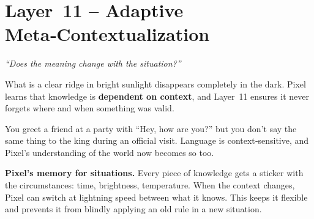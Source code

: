 \section{Layer~11 – Adaptive Meta‑Contextualization}
\label{sec:layer11}

\begin{tcolorbox}[colback=blue!5, colframe=blue!60, title=\textbf{Superpower: The Contextualiser}]
\begin{center}
\textit{“Does the meaning change with the situation?”}
\end{center}
\end{tcolorbox}

What is a clear ridge in bright sunlight disappears completely in the
dark.  Pixel learns that knowledge is \textbf{dependent on context},
and Layer~11 ensures it never forgets where and when something was
valid.

\begin{tcolorbox}[colback=yellow!5, colframe=yellow!80, title=Real‑life analogy]
You greet a friend at a party with “Hey, how are you?” but you don’t
say the same thing to the king during an official visit.  Language is
context‑sensitive, and Pixel’s understanding of the world now becomes
so too.
\end{tcolorbox}

\textbf{Pixel’s memory for situations.}
Every piece of knowledge gets a sticker with the circumstances: time,
brightness, temperature.  When the context changes, Pixel can switch
at lightning speed between what it knows.  This keeps it flexible and
prevents it from blindly applying an old rule in a new situation.